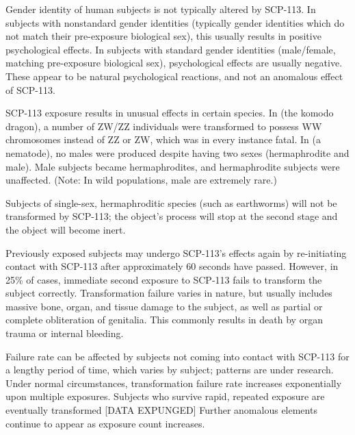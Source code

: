 Gender identity of human subjects is not typically altered by SCP-113. In subjects with nonstandard gender identities (typically gender identities which do not match their pre-exposure biological sex), this usually results in positive psychological effects. In subjects with standard gender identities (male\slash female, matching pre-exposure biological sex), psychological effects are usually negative. These appear to be natural psychological reactions, and not an anomalous effect of SCP-113.

SCP-113 exposure results in unusual effects in certain species. In  (the komodo dragon), a number of ZW\slash ZZ individuals were transformed to possess WW chromosomes instead of ZZ or ZW, which was in every instance fatal. In  (a nematode), no males were produced despite  having two sexes (hermaphrodite and male). Male subjects became hermaphrodites, and hermaphrodite subjects were unaffected. (Note: In wild populations, male  are extremely rare.)

Subjects of single-sex, hermaphroditic species (such as earthworms) will not be transformed by SCP-113; the object's process will stop at the second stage and the object will become inert.

Previously exposed subjects may undergo SCP-113's effects again by re-initiating contact with SCP-113 after approximately 60 seconds have passed. However, in 25\% of cases, immediate second exposure to SCP-113 fails to transform the subject correctly. Transformation failure varies in nature, but usually includes massive bone, organ, and tissue damage to the subject, as well as partial or complete obliteration of genitalia. This commonly results in death by organ trauma or internal bleeding.

Failure rate can be affected by subjects not coming into contact with SCP-113 for a lengthy period of time, which varies by subject; patterns are under research. Under normal circumstances, transformation failure rate increases exponentially upon multiple exposures. Subjects who survive rapid, repeated exposure are eventually transformed {[}DATA EXPUNGED] Further anomalous elements continue to appear as exposure count increases.
